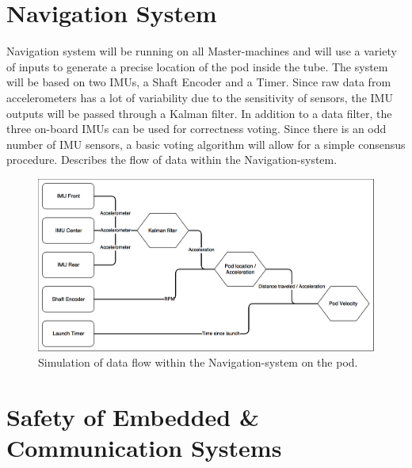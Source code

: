         
\section{Navigation System}
Navigation system will be running on all Master-machines and will use a variety of inputs to generate a precise location of the pod inside the tube. The system will be based on two IMUs, a Shaft Encoder and a Timer. Since raw data from accelerometers has a lot of variability due to the sensitivity of sensors, the IMU outputs will be passed through a Kalman filter. In addition to a data filter, the three on-board IMUs can be used for correctness voting. Since there is an odd number of IMU sensors, a basic voting algorithm will allow for a simple consensus procedure.  Describes the flow of data within the Navigation-system.

\begin{figure}
    \centering
    \includegraphics[width=\textwidth]{images/navigation_system.png}
    \caption{Simulation of data flow within the Navigation-system on the pod.}
    \label{fig:navigation-system}
\end{figure}

\section{Safety of Embedded \& Communication Systems}
